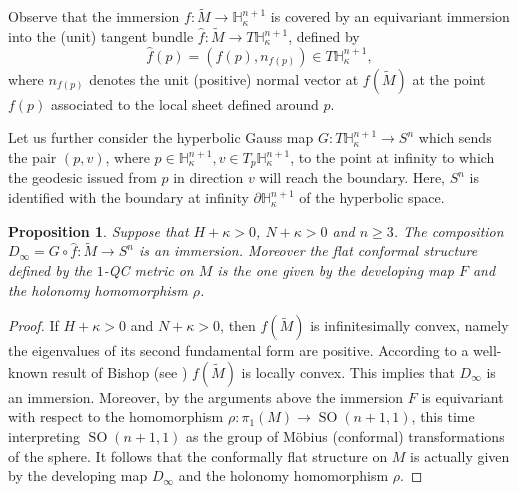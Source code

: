 \documentclass[10pt]{amsart}
\DeclareMathOperator{\SO}{SO}
\newtheorem{proposition}[theorem]{Proposition}
\theoremstyle{definition}
\theoremstyle{remark}
\numberwithin{equation}{section}
\begin{document}
Observe that the immersion $f:\widetilde{M}\to \mathbb H_{\kappa}^{n+1}$
is covered by an equivariant immersion into the (unit) tangent bundle
$\hat{f}:\widetilde{M}\to T\mathbb H_{\kappa}^{n+1}$, defined by
\[ \hat{f}(p)=(f(p), n_{f(p)})\in T\mathbb H_{\kappa}^{n+1},\]
where $n_{f(p)}$ denotes the unit (positive) normal vector at
$f(\widetilde{M})$ at the point $f(p)$ associated to the local sheet
defined around $p$.

Let us further consider the hyperbolic Gauss map $G:T\mathbb H_{\kappa}^{n+1}\to S^n$
which sends the pair $(p,v)$, where $p\in \mathbb H_{\kappa}^{n+1},
v\in T_p\mathbb H_{\kappa}^{n+1}$, to the point at infinity to which the
geodesic issued from $p$ in direction $v$ will reach the boundary.
Here, $S^n$ is identified with the boundary at infinity
$\partial\mathbb H_{\kappa}^{n+1}$ of the hyperbolic space.

\begin{proposition}\label{conf}
Suppose that $H+\kappa >0$, $N+\kappa>0$ and $n\geq3$.
The composition $D_{\infty}=G\circ \hat{f}:\widetilde{M}\to S^n$ is an immersion.
Moreover the flat conformal structure defined by the $1$-QC metric on $M$
is the one given by the developing map $F$ and the holonomy homomorphism $\rho$.
\end{proposition}
\begin{proof}
If $H+\kappa >0$ and $N+\kappa >0$, then $f(\widetilde{M})$ is infinitesimally convex, namely the eigenvalues
of its second fundamental form are positive. According to a well-known result of Bishop (see \cite{Bi})
$f(\widetilde{M})$ is locally convex. This implies that $D_{\infty}$ is an immersion.
Moreover, by the arguments above the immersion $F$ is equivariant
with respect to the homomorphism $\rho:\pi_1(M)\to \SO(n+1,1)$, this time
interpreting $\SO(n+1,1)$ as the group of Möbius (conformal) transformations of the sphere.
It follows that the conformally flat structure on $M$ is
actually given by the developing map $D_{\infty}$ and the holonomy homomorphism
$\rho$.
\end{proof}
\end{document}
